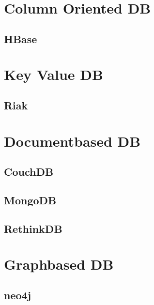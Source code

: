 \part{Column Oriented DB}
\chapter{HBase}


\part{Key Value DB}










\chapter{Riak}





\part{Documentbased DB}
 
\chapter{CouchDB}

%
%
%
%

\chapter{MongoDB}







\chapter{RethinkDB}



\part{Graphbased DB}
\chapter{neo4j}

